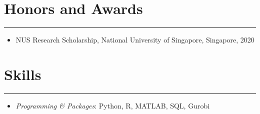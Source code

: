 \documentclass[12pt, a4paper]{article}
\begin{document}
{\section*{Honors and Awards}
\vspace*{0.4em}
\hrule height 0.5pt
\begin{itemize}[leftmargin=36pt, itemsep=1pt, parsep=0.5pt, topsep=1pt]

	\item NUS Research Scholarship, National University of Singapore, Singapore, 2020
	



\end{itemize}




\section*{Skills}
\vspace*{0.4em}
\hrule height 0.5pt
\begin{itemize}[leftmargin=36pt, itemsep=2pt, parsep=0.2pt, topsep=1pt]

	\item {\it Programming \& Packages}: Python, R, MATLAB, SQL, Gurobi

\end{itemize}
}



\end{document}
